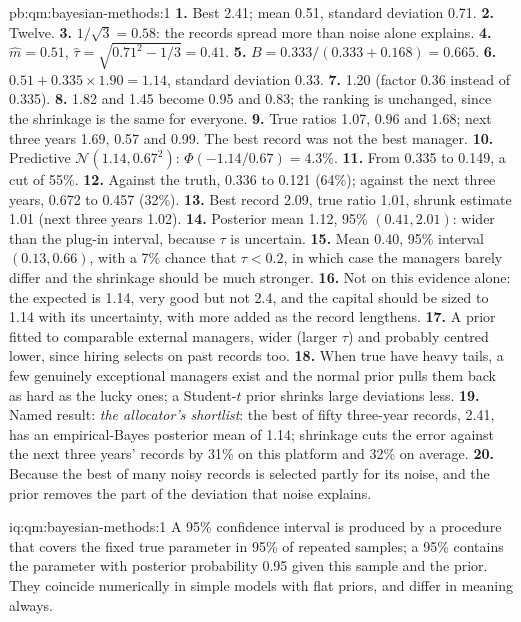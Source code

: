 \begin{solution}{pb:qm:bayesian-methods:1}
\textbf{1.} Best 2.41; mean 0.51, standard deviation 0.71.
\textbf{2.} Twelve.
\textbf{3.} $1/\sqrt3 = 0.58$: the records spread more than noise alone explains.
\textbf{4.} $\hat m = 0.51$, $\hat\tau = \sqrt{0.71^2 - 1/3} = 0.41$.
\textbf{5.} $B = 0.333/(0.333 + 0.168) = 0.665$.
\textbf{6.} $0.51 + 0.335 \times 1.90 = 1.14$, standard deviation 0.33.
\textbf{7.} 1.20 (factor 0.36 instead of 0.335).
\textbf{8.} 1.82 and 1.45 become 0.95 and 0.83; the ranking is unchanged, since the shrinkage is the same for everyone.
\textbf{9.} True ratios 1.07, 0.96 and 1.68; next three years 1.69, 0.57 and 0.99. The best record was not the best manager.
\textbf{10.} Predictive $\mathcal N(1.14, 0.67^2)$: $\Phi(-1.14/0.67) = 4.3\%$.
\textbf{11.} From 0.335 to 0.149, a cut of 55\%.
\textbf{12.} Against the truth, 0.336 to 0.121 (64\%); against the next three years, 0.672 to 0.457 (32\%).
\textbf{13.} Best record 2.09, true ratio 1.01, shrunk estimate 1.01 (next three years 1.02).
\textbf{14.} Posterior mean 1.12, 95\%  $(0.41, 2.01)$: wider than the plug-in interval, because $\tau$ is uncertain.
\textbf{15.} Mean 0.40, 95\% interval $(0.13, 0.66)$, with a 7\% chance that $\tau < 0.2$, in which case the managers barely differ and the
shrinkage should be much stronger.
\textbf{16.} Not on this evidence alone: the expected  is 1.14, very good but not 2.4, and the capital should be sized to 1.14
with its uncertainty, with more added as the record lengthens.
\textbf{17.} A prior fitted to comparable external managers, wider (larger $\tau$) and probably centred lower, since hiring selects on
past records too.
\textbf{18.} When true  have heavy tails, a few genuinely exceptional managers exist and the normal prior pulls them back as hard
as the lucky ones; a Student-$t$ prior shrinks large deviations less.
\textbf{19.} Named result: \emph{the allocator's shortlist}: the best of fifty three-year records, 2.41, has an empirical-Bayes posterior
mean of 1.14; shrinkage cuts the error against the next three years' records by 31\% on this platform and 32\% on average.
\textbf{20.} Because the best of many noisy records is selected partly for its noise, and the prior removes the part of the deviation that
noise explains.
\end{solution}

\begin{solution}{iq:qm:bayesian-methods:1}
A 95\% confidence interval is produced by a procedure that covers the fixed true parameter in 95\% of repeated samples; a 95\%  contains the parameter with posterior probability 0.95 given this sample and the prior. They coincide numerically in simple
models with flat priors, and differ in meaning always.
\end{solution}

